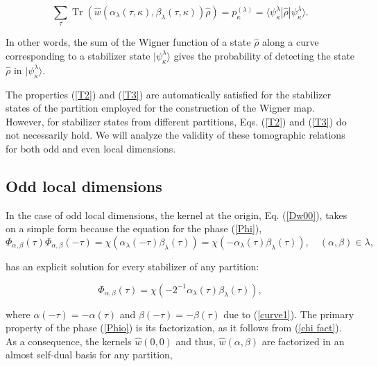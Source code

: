 \documentclass[quantumrep,article,submit,pdftex,moreauthors]{Definitions/mdpi}
\DeclareMathOperator{\Tr}{Tr}
\begin{document}
\begin{equation}
  \sum_{\tau } \Tr\left(
    \hat{w}\left(
      \alpha_{\lambda}(\tau,\kappa),\beta_{\lambda}(\tau,\kappa)
    \right)
    \hat{\rho}
  \right)
  = p_{\kappa}^{(\lambda)} = \langle \psi_{\kappa}^{\lambda}
  |\hat{\rho}|\psi_{\kappa}^{\lambda}\rangle.
  \label{T3}
\end{equation}

In other words, the sum of the Wigner function of a state $\hat{\rho}$ along a
curve corresponding to a stabilizer state $|\psi _{\kappa }^{\lambda }\rangle$
gives the probability of detecting the state $\hat{\rho}$ in $|\psi_{\kappa
}^{\lambda}\rangle$.

The properties (\ref{T2}) and (\ref{T3}) are automatically satisfied for the
stabilizer states of the partition employed for the construction of the Wigner
map. However, for stabilizer states from different partitions, Eqs.
(\ref{T2}) and (\ref{T3}) do not necessarily hold. We will analyze the validity
of these tomographic relations for both odd and even local dimensions.

\subsection{Odd local dimensions}

In the case of odd local dimensions, the kernel at the origin, Eq.
(\ref{Dw00}), takes on a simple form because the equation for the phase
(\ref{Phi}),
\begin{equation*}
  \Phi_{\alpha,\beta} (\tau) \Phi_{\alpha,\beta}(-\tau)
  = \chi\left(\alpha_{\lambda}(-\tau)\beta_{\lambda}(\tau)\right)
  = \chi\left(-\alpha_{\lambda}(\tau)\beta_{\lambda}(\tau)\right),
  \quad (\alpha,\beta) \in \lambda,
\end{equation*}

has an explicit solution for every stabilizer of any partition:%

\begin{equation}
  \Phi_{\alpha,\beta}(\tau)
  = \chi\left(
    -2^{-1}\alpha_{\lambda }(\tau) \beta_{\lambda }(\tau)
  \right),
  \label{Phio}
\end{equation}

where $\alpha(-\tau) = -\alpha(\tau)$ and $\beta(-\tau) = -\beta(\tau)$
due to (\ref{curve1}). The primary property of the phase (\ref{Phio}) is its
factorization, as it follows from (\ref{chi fact}). As a consequence, the
kernels $\hat{w}\left(0,0\right)$ and thus, $\hat{w}\left(\alpha,\beta\right)$
are factorized in an almost self-dual basis for any partition,
\end{document}

